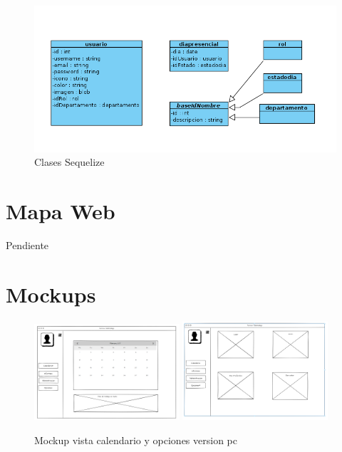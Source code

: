 \documentclass[11pt,spanish,listoffigures,listoftables]{tfgetsinf}
\begin{document}
\begin{figure}[h!] %
  \includegraphics[width=\linewidth]{img/Clases sequelize.png}
  \caption{Clases Sequelize}
  \label{fig:clasesSequelize}
\end{figure}

\section{Mapa Web}

Pendiente

\section{Mockups}

\begin{figure}[ht!] %
   \includegraphics[width=0.48\textwidth]{img/Vista_Calendario_PC.png}
   \includegraphics[width=0.48\textwidth]{img/Vista_Opciones_PC.png}
   \caption{Mockup vista calendario y opciones version pc}
   \label{fig:calendarioPC}
 \end{figure}
\end{document}
